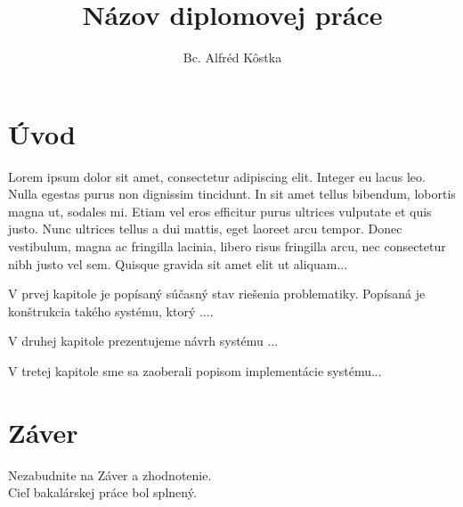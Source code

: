 \documentclass[12pt]{article}
\title{Názov diplomovej práce}
\author{Bc. Alfréd Kôstka}
\begin{document}



%

%




\tableofcontents
\pagebreak
\listoffigures
\pagebreak

\printglossary[type=\acronymtype,title={Zoznam skratiek a značiek}]


\section{Úvod}
Lorem ipsum dolor sit amet, consectetur adipiscing elit. Integer eu lacus leo. Nulla egestas purus non dignissim tincidunt. In sit amet tellus bibendum, lobortis magna ut, sodales mi. Etiam vel eros efficitur purus ultrices vulputate et quis justo. Nunc ultrices tellus a dui mattis, eget laoreet arcu tempor. Donec vestibulum, magna ac fringilla lacinia, libero risus fringilla arcu, nec consectetur nibh justo vel sem. Quisque gravida sit amet elit ut aliquam...\par
\vspace{1em}
\noindent
V prvej kapitole je popísaný súčasný stav riešenia problematiky. Popísaná je konštrukcia takého systému, ktorý ....

\noindent
V druhej kapitole prezentujeme návrh systému ...

\noindent
V tretej kapitole sme sa zaoberali popisom implementácie systému...

 

\section{Záver}
Nezabudnite na Záver a zhodnotenie.\\  
Cieľ bakalárskej práce bol splnený.


\newpage
\printbibliography[title={Použitá literatúra}]


\end{document}
